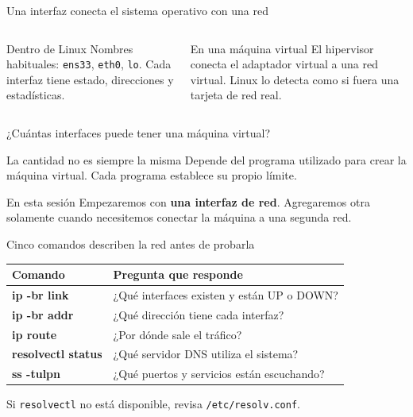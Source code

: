 \documentclass[aspectratio=169,10pt,c]{beamer}
\begin{document}
\begin{frame}{Una interfaz conecta el sistema operativo con una red}
\begin{columns}[T,onlytextwidth]
\begin{block}{Dentro de Linux}
\small Nombres habituales: \texttt{ens33}, \texttt{eth0}, \texttt{lo}. Cada interfaz tiene estado, direcciones y estadísticas.
\end{block}
\begin{exampleblock}{En una máquina virtual}
\small El hipervisor conecta el adaptador virtual a una red virtual. Linux lo detecta como si fuera una tarjeta de red real.
\end{exampleblock}
\end{columns}
\end{frame}

\begin{frame}{¿Cuántas interfaces puede tener una máquina virtual?}
\begin{block}{La cantidad no es siempre la misma}
Depende del programa utilizado para crear la máquina virtual. Cada programa establece su propio límite.
\end{block}
\vspace{0.35cm}
\begin{exampleblock}{En esta sesión}
Empezaremos con \textbf{una interfaz de red}. Agregaremos otra solamente cuando necesitemos conectar la máquina a una segunda red.
\end{exampleblock}
\end{frame}

\begin{frame}{Cinco comandos describen la red antes de probarla}
\begin{center}
\small
\begin{tabular}{>{\ttfamily\bfseries}p{3.5cm}p{7.6cm}}
\toprule
Comando & Pregunta que responde \\
\midrule
ip -br link & ¿Qué interfaces existen y están UP o DOWN? \\
ip -br addr & ¿Qué dirección tiene cada interfaz? \\
ip route & ¿Por dónde sale el tráfico? \\
resolvectl status & ¿Qué servidor DNS utiliza el sistema? \\
ss -tulpn & ¿Qué puertos y servicios están escuchando? \\
\bottomrule
\end{tabular}
\end{center}
\small Si \texttt{resolvectl} no está disponible, revisa \texttt{/etc/resolv.conf}.
\end{frame}
\end{document}
